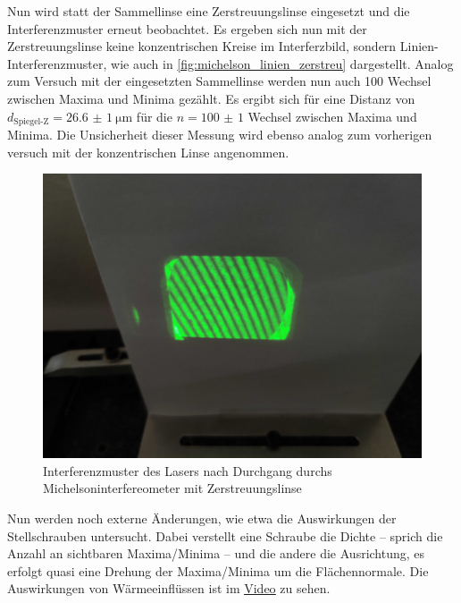 \documentclass[ngerman]{scrartcl}
\begin{document}
Nun wird statt der Sammellinse eine Zerstreuungslinse eingesetzt und die Interferenzmuster erneut beobachtet. Es ergeben sich nun mit der Zerstreuungslinse keine konzentrischen Kreise im Interferzbild, sondern Linien-Interferenzmuster, wie auch in \autoref{fig:michelson_linien_zerstreu} dargestellt.
Analog zum Versuch mit der eingesetzten Sammellinse werden nun auch 100 Wechsel zwischen Maxima und Minima gezählt. Es ergibt sich für eine Distanz von $d_\text{Spiegel-Z} = \SI{26.6(10)}{\micro\meter}$ für die $n = \num{100(1)}$ Wechsel zwischen Maxima und Minima. Die Unsicherheit dieser Messung wird ebenso analog zum vorherigen versuch mit der konzentrischen Linse angenommen.
%
\begin{figure}[H]
    \centering
    \begin{samepage}
        \includegraphics[width=0.7\linewidth]{fig/Compressed/Zerstreuungslinse.jpg}
        \caption[Interferenzmuster Michelsoninterfereometer Zerstreuungslinse]{Interferenzmuster des Lasers nach Durchgang durchs Michelsoninterfereometer mit Zerstreuungslinse}
        \label{fig:michelson_linien_zerstreu}
    \end{samepage}
\end{figure}
%
Nun werden noch externe Änderungen, wie etwa die Auswirkungen der Stellschrauben untersucht. Dabei verstellt eine Schraube die Dichte -- sprich die Anzahl an sichtbaren Maxima/Minima -- und die andere die Ausrichtung, es erfolgt quasi eine Drehung der Maxima/Minima um die Flächennormale.
Die Auswirkungen von Wärmeeinflüssen ist im \underline{\href{https://etschgi1.github.io/files/UNI_hosting/Misc/FP2/Interferometrie/Stoerungen.mp4}{Video}} zu sehen.
\end{document}
